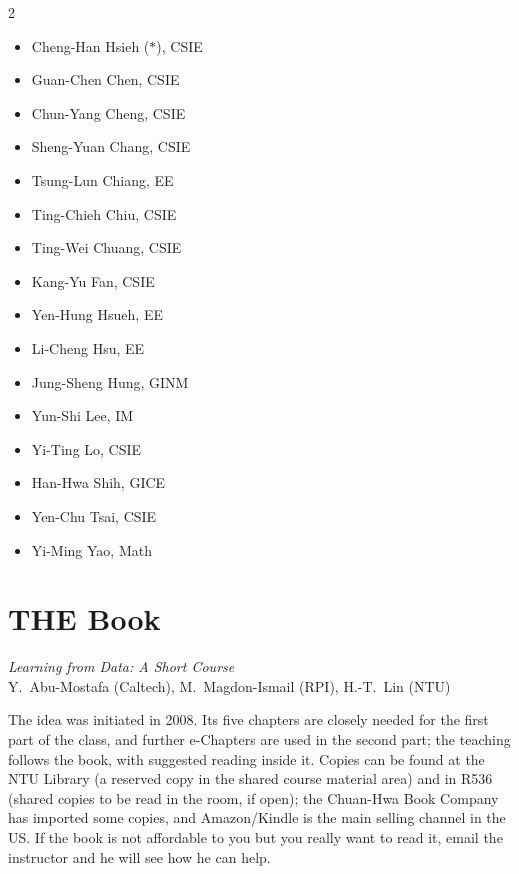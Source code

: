 \documentclass[a4paper,oneside]{scrbook}
\begin{document}
\begin{multicols}{2}
    \begin{itemize}
        \item Cheng-Han Hsieh (\(*\)), CSIE
        \item Guan-Chen Chen, CSIE
        \item Chun-Yang Cheng, CSIE
        \item Sheng-Yuan Chang, CSIE
        \item Tsung-Lun Chiang, EE
        \item Ting-Chieh Chiu, CSIE
        \item Ting-Wei Chuang, CSIE
        \item Kang-Yu Fan, CSIE
        \item Yen-Hung Hsueh, EE
        \item Li-Cheng Hsu, EE
        \item Jung-Sheng Hung, GINM
        \item Yun-Shi Lee, IM
        \item Yi-Ting Lo, CSIE
        \item Han-Hwa Shih, GICE
        \item Yen-Chu Tsai, CSIE
        \item Yi-Ming Yao, Math
    \end{itemize}
\end{multicols}

\section*{THE Book}

\begin{center}
    \emph{Learning from Data: A Short Course}\\
    Y.~Abu-Mostafa (Caltech), M.~Magdon-Ismail (RPI), H.-T.~Lin (NTU)
\end{center}

The idea was initiated in 2008. Its five chapters are closely needed for the
first part of the class, and further e-Chapters are used in the second part; the
teaching follows the book, with suggested reading inside it. Copies can be found
at the NTU Library (a reserved copy in the shared course material area) and in
R536 (shared copies to be read in the room, if open); the Chuan-Hwa Book Company
has imported some copies, and Amazon/Kindle is the main selling channel in the
US. If the book is not affordable to you but you really want to read it, email
the instructor and he will see how he can help.
\end{document}
